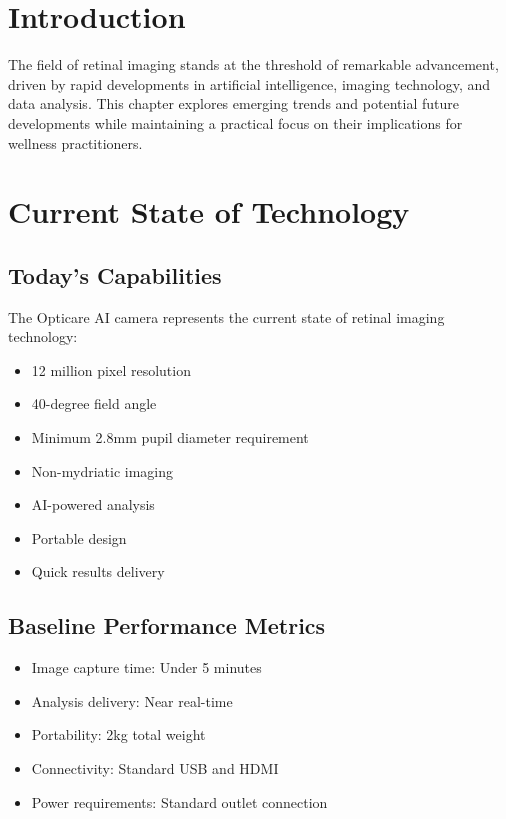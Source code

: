 \documentclass[
  Letterpaper,
]{scrbook}
\providecommand{\tightlist}{%
  \setlength{\itemsep}{0pt}\setlength{\parskip}{0pt}}\usepackage{longtable,booktabs,array}
\begin{document}
\section{Introduction}\label{introduction-1}

The field of retinal imaging stands at the threshold of remarkable
advancement, driven by rapid developments in artificial intelligence,
imaging technology, and data analysis. This chapter explores emerging
trends and potential future developments while maintaining a practical
focus on their implications for wellness practitioners.

\section{Current State of Technology}\label{current-state-of-technology}

\subsection{Today's Capabilities}\label{todays-capabilities}

The Opticare AI camera represents the current state of retinal imaging
technology:

\begin{itemize}
\tightlist
\item
  12 million pixel resolution
\item
  40-degree field angle
\item
  Minimum 2.8mm pupil diameter requirement
\item
  Non-mydriatic imaging
\item
  AI-powered analysis
\item
  Portable design
\item
  Quick results delivery
\end{itemize}

\subsection{Baseline Performance
Metrics}\label{baseline-performance-metrics}

\begin{itemize}
\tightlist
\item
  Image capture time: Under 5 minutes
\item
  Analysis delivery: Near real-time
\item
  Portability: 2kg total weight
\item
  Connectivity: Standard USB and HDMI
\item
  Power requirements: Standard outlet connection
\end{itemize}
\end{document}
